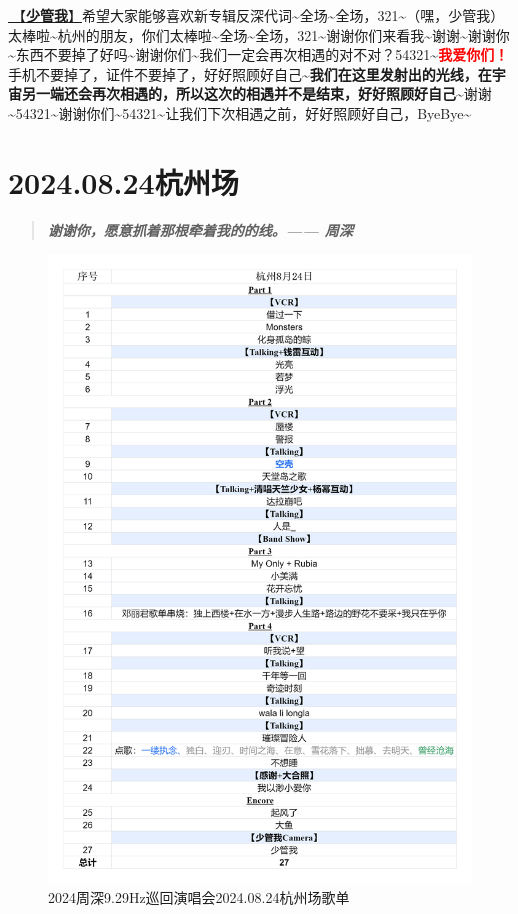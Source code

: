 \documentclass[]{ctexbook}
\begin{document}
\hyperref[watch-ur-manners]{🎵【\textbf{少管我}】}希望大家能够喜欢新专辑反深代词\textasciitilde 全场\textasciitilde 全场，321\textasciitilde（嘿，少管我）太棒啦\textasciitilde 杭州的朋友，你们太棒啦\textasciitilde 全场\textasciitilde 全场，321\textasciitilde 谢谢你们来看我\textasciitilde 谢谢\textasciitilde 谢谢你\textasciitilde 东西不要掉了好吗\textasciitilde 谢谢你们\textasciitilde 我们一定会再次相遇的对不对？54321\textasciitilde{}\textbf{\textcolor{red}{我爱你们！}}手机不要掉了，证件不要掉了，好好照顾好自己\textasciitilde{}\textbf{我们在这里发射出的光线，在宇宙另一端还会再次相遇的，所以这次的相遇并不是结束，好好照顾好自己\textasciitilde{}}谢谢\textasciitilde54321\textasciitilde 谢谢你们\textasciitilde54321\textasciitilde 让我们下次相遇之前，好好照顾好自己，ByeBye\textasciitilde{}

\chapter{2024.08.24杭州场}\label{hangzhou-20240824}

\begin{quote}
\textbf{\emph{谢谢你，愿意抓着那根牵着我的的线。------ 周深}}
\end{quote}

\begin{figure}

{\centering \includegraphics[width=320pt]{img/playlists/playlists-hangzhou-20240824} 

}

\caption{2024周深9.29Hz巡回演唱会2024.08.24杭州场歌单}\label{fig:unnamed-chunk-84}
\end{figure}
\end{document}
